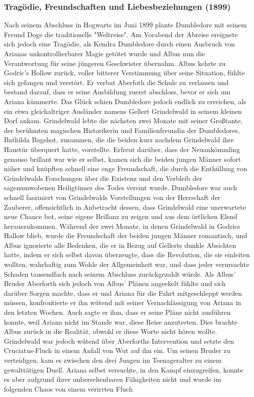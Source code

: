 \documentclass[a4paper, 10pt]{article}
\begin{document}
\subsubsection*{\large Tragödie, Freundschaften und Liebesbeziehungen (1899)}
Nach seinem Abschluss in Hogwarts im Juni 1899 plante Dumbledore mit seinem Freund Doge die traditionelle "Weltreise". Am Vorabend der Abreise ereignete sich jedoch eine Tragödie, als Kendra Dumbledore durch einen Ausbruch von Arianas unkontrollierbarer Magie getötet wurde und Albus nun die Verantwortung für seine jüngeren Geschwister übernahm. Albus kehrte zu Godric's Hollow zurück, voller bitterer Verstimmung über seine Situation, fühlte sich gefangen und verstört. Er verbat Aberfoth die Schule zu verlassen und bestand darauf, dass er seine Ausbildung zuerst abschloss, bevor er sich um Ariana kümmerte. Das Glück schien Dumbledore jedoch endlich zu erreichen, als ein etwa gleichaltriger Ausländer namens Gellert Grindelwald in seinem kleinen Dorf ankam. Grindelwald lebte die nächsten zwei Monate mit seiner Großtante, der berühmten magischen Historikerin und Familienfreundin der Dumbledores, Bathilda Bagshot, zusammen, die die beiden kurz nachdem Grindelwald ihre Haustür überquert hatte, vorstellte. Erfreut darüber, dass der Neuankömmling genauso brillant war wie er selbst, kamen sich die beiden jungen Männer sofort näher und knüpften schnell eine enge Freundschaft, die durch die Enthüllung von Grindelwalds Forschungen über die Existenz und den Verbleib der sagenumwobenen Heiligtümer des Todes vereint wurde. Dumbledore war auch schnell fasziniert von Grindelwalds Vorstellungen von der Herrschaft der Zauberer, offensichtlich in Anbetracht dessen, dass Grindelwald eine unerwartete neue Chance bot, seine eigene Brillanz zu zeigen und aus dem örtlichen Elend herauszukommen. Während der zwei Monate, in denen Grindelwald in Godrics Hallow blieb, wurde die Freundschaft der beiden jungen Männer romantisch, und Albus ignorierte alle Bedenken, die er in Bezug auf Gellerts dunkle Absichten hatte, indem er sich selbst davon überzeugte, dass die Revolution, die sie einleiten wollten, wahrhaftig zum Wohle der Allgemeinheit war, und dass jeder verursachte Schaden tausendfach nach seinem Abschluss zurückgezahlt würde.
\vspace{10pt}
\newline
{}  
Als Albus' Bruder Aberforth sich jedoch von Albus' Plänen angeekelt fühlte und sich darüber Sorgen machte, dass er und Ariana für die Fahrt mitgeschleppt werden müssen, konfrontierte er ihn wütend mit seiner Vernachlässigung von Ariana in den letzten Wochen. Auch sagte er ihm, dass er seine Pläne nicht ausführen konnte, weil Ariana nicht im Stande war, diese Reise anzutreten. Dies brachte Albus zurück in die Realität, obwohl er diese Worte nicht hören wollte. Grindelwald war jedoch wütend über Aberforths Intervention und setzte den Cruciatus-Fluch in einem Anfall von Wut auf ihn ein. Um seinen Bruder zu verteidigen, kam es zwischen den drei Jungen im Teenageralter zu einem gewalttätigen Duell. Ariana selbst versuchte, in den Kampf einzugreifen, konnte es aber aufgrund ihrer unberechenbaren Fähigkeiten nicht und wurde im folgenden Chaos von einem verirrten Fluch
\end{document}

